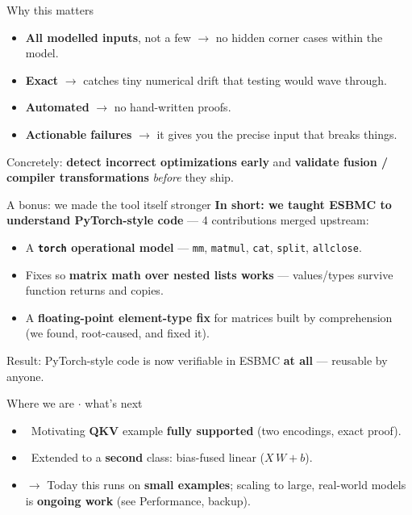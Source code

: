 \documentclass[aspectratio=169,11pt]{beamer}
\newcommand{\good}{\textcolor{ok}{\ding{51}}}
\begin{document}
\begin{frame}{Why this matters}
  \begin{itemize}
    \item \textbf{All modelled inputs}, not a few $\rightarrow$ no hidden corner cases within the model.
    \item \textbf{Exact} $\rightarrow$ catches tiny numerical drift that testing would wave through.
    \item \textbf{Automated} $\rightarrow$ no hand-written proofs.
    \item \textbf{Actionable failures} $\rightarrow$ it gives you the precise input that breaks things.
  \end{itemize}

  \bigskip
  \begin{block}{}
    Concretely: \textbf{detect incorrect optimizations early} and \textbf{validate fusion / compiler
    transformations} \emph{before} they ship.
  \end{block}
\end{frame}

\begin{frame}{A bonus: we made the tool itself stronger}
  \textbf{In short: we taught ESBMC to understand PyTorch-style code} ---
  4 contributions merged upstream:

  \bigskip
  \begin{itemize}
    \item A \textbf{\texttt{torch} operational model} --- \texttt{mm}, \texttt{matmul}, \texttt{cat},
      \texttt{split}, \texttt{allclose}.
    \item Fixes so \textbf{matrix math over nested lists works} --- values/types survive function
      returns and copies.
    \item A \textbf{floating-point element-type fix} for matrices built by comprehension
      (we found, root-caused, and fixed it).
  \end{itemize}

  \bigskip
  {\footnotesize Result: PyTorch-style code is now verifiable in ESBMC \textbf{at all} --- reusable by anyone.}
\end{frame}

\begin{frame}{Where we are $\cdot$ what's next}
  \begin{itemize}
    \item \good\ Motivating \textbf{QKV} example \textbf{fully supported} (two encodings, exact proof).
    \item \good\ Extended to a \textbf{second} class: bias-fused linear ($X\,W + b$).
    \item $\rightarrow$ Today this runs on \textbf{small examples}; scaling to large, real-world
      models is \textbf{ongoing work} (see Performance, backup).
  \end{itemize}
\end{frame}
\end{document}
